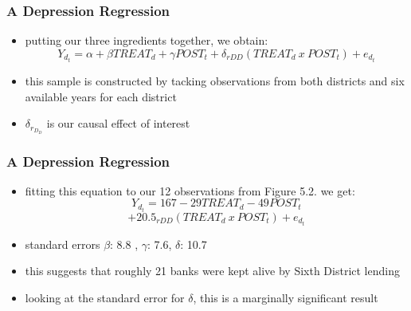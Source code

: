 \documentclass{beamer}
\begin{document}
\begin{frame}
\frametitle{A Depression Regression}
\begin{itemize}
	\item putting our three ingredients together, we obtain:
	$$Y_d_t = \alpha + \beta TREAT_d + \gamma POST_t + \delta_{rDD} (TREAT_d ~x~POST_t) + e_d_t$$
	\item this sample is constructed by tacking observations from both districts and six available years for each district
	\item $\delta_r_D_D$ is our causal effect of interest
\end{itemize}

\end{frame}

\begin{frame}
\frametitle{A Depression Regression}
\begin{itemize}
	\item fitting this equation to our 12 observations from Figure 5.2. we get:
	$$Y_d_t = 167 - 29 TREAT_d - 49 POST_t $$
	$$+ 20.5_{rDD} (TREAT_d ~x~POST_t) + e_d_t $$
	\item standard errors $\beta$: 8.8 , $\gamma$: 7.6, $\delta$: 10.7
	\item this suggests that roughly 21 banks were kept alive by Sixth District lending
	\item looking at the standard error for $\delta$, this is a marginally significant result
\end{itemize}

\end{frame}
\end{document}

